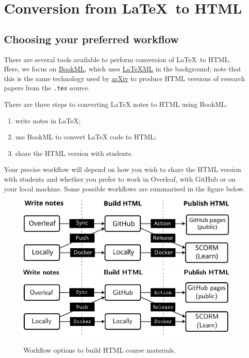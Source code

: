 \chapter{Conversion from \protect\LaTeX\ to HTML}
\label{ch:latex-to-html}

\section{Choosing your preferred workflow}

There are several tools available to perform conversion of \LaTeX\ to HTML. Here, we focus on \href{https://vlmantova.github.io/bookml/}{BookML}, which uses \href{https://math.nist.gov/~BMiller/LaTeXML/}{LaTeXML} in the background; note that this is the same technology used by \href{https://info.arxiv.org/about/accessible_HTML.html}{arXiv} to produce HTML versions of research papers from the \verb|.tex| source.

There are three steps to converting LaTeX notes to HTML using BookML:
\begin{enumerate}
    \item write notes in \LaTeX{};
    \item use BookML to convert \LaTeX{} code to HTML;
    \item share the HTML version with students.
\end{enumerate}
Your precise workflow will depend on how you wish to share the HTML version with students and whether you prefer to work in Overleaf, with GitHub or on your local machine. Some possible workflows are summarised in the figure below.


\begin{figure}[h]
    \centering
    \iflatexml
        \includegraphics{img/process.svg}
    \else
        \includegraphics{img/process.pdf}
    \fi
    \caption{Workflow options to build HTML course materials.}
    \label{fig:workflow}
\end{figure}

